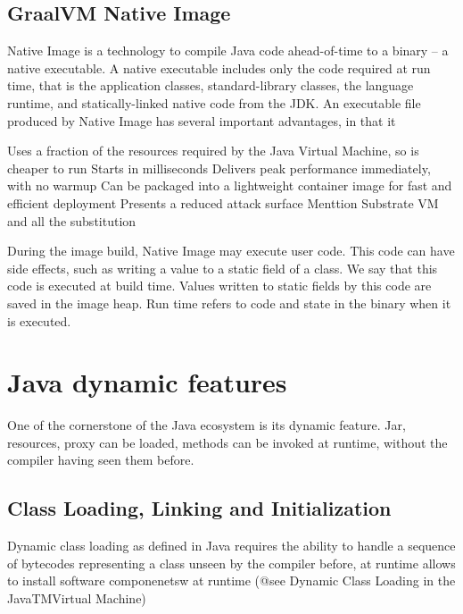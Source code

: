 \subsection{GraalVM Native Image}

Native Image\cite{noauthor_native_nodate, noauthor_native_nodate-1} is a technology to compile Java code ahead-of-time to a binary – a native executable. A native executable includes only the code required at run time, that is the application classes, standard-library classes, the language runtime, and statically-linked native code from the JDK.
An executable file produced by Native Image has several important advantages, in that it

Uses a fraction of the resources required by the Java Virtual Machine, so is cheaper to run
Starts in milliseconds
Delivers peak performance immediately, with no warmup
Can be packaged into a lightweight container image for fast and efficient deployment
Presents a reduced attack surface
Menttion Substrate VM and all the substitution

During the image build, Native Image may execute user code. This code can have side effects, such as writing a value to a static field of a class. We say that this code is executed at build time. Values written to static fields by this code are saved in the image heap. Run time refers to code and state in the binary when it is executed.

\section{Java dynamic features}
One of the cornerstone of the Java ecosystem is its dynamic feature. Jar, resources, proxy can be loaded, methods can be invoked at runtime, without the compiler having seen them before. 

\subsection{Class Loading, Linking and Initialization}
Dynamic class loading as defined in Java requires the ability to handle a sequence of bytecodes representing a class unseen by the compiler before, at runtime allows to install software componenetsw at runtime (@see Dynamic Class Loading in the JavaTMVirtual Machine)

